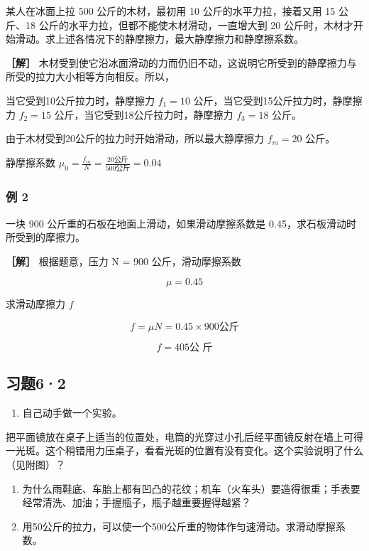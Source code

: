某人在冰面上拉 500 公斤的木材，最初用 10 公斤的水平力拉，接着又用 15
公斤、18 公斤的水平力拉，但都不能使木材滑动，一直增大到 20
公斤时，木材才开始滑动。求上述各情况下的静摩擦力，最大静摩擦力和静摩擦系数。

\textbf{［解］}
木材受到使它沿冰面滑动的力而仍旧不动，这说明它所受到的静摩擦力与所受的拉力大小相等方向相反。所以，

当它受到10公斤拉力时，静摩擦力 \(f_{1}=10\)
公斤，当它受到15公斤拉力时，静摩擦力 \(f_{2}=15\)
公斤，当它受到18公斤拉力时，静摩擦力 \(f_{3}=18\) 公斤。

由于木材受到20公斤的拉力时开始滑动，所以最大静摩擦力 \(f_{m}=20\) 公斤。

静摩擦系数
\(\mu_{0}=\frac{f_{m}}{N}=\frac{20\text{公斤}}{500\text{公斤}}=0.04\)

\subsubsection{例 2}\label{ux4f8b-2-6}

一块 900 公斤重的石板在地面上滑动，如果滑动摩擦系数是
0.45，求石板滑动时所受到的摩擦力。

\textbf{［解］} 根据题意，压力 N = 900 公斤，滑动摩擦系数

\[
\mu = 0.45
\]

求滑动摩擦力 \(f\)

\[
f = \mu N = 0.45 \times 900 \text{公斤}
\]

\[
f = 405 \text{公 斤}
\]

\subsection{习题6·2}\label{ux4e60ux989862}

\begin{enumerate}
\def\labelenumi{\arabic{enumi}.}
\tightlist
\item
  自己动手做一个实验。
\end{enumerate}

把平面镜放在桌子上适当的位置处，电筒的光穿过小孔后经平面镜反射在墙上可得一光斑。这个稍错用力压桌子，看看光斑的位置有没有变化。这个实验说明了什么（见附图）？

\begin{enumerate}
\def\labelenumi{\arabic{enumi}.}
\setcounter{enumi}{1}
\item
  为什么雨鞋底、车胎上都有凹凸的花纹；机车（火车头）要造得很重；手表要经常清洗、加油；手握瓶子，瓶子越重要握得越紧？
\item
  用50公斤的拉力，可以使一个500公斤重的物体作匀速滑动。求滑动摩擦系数。
\end{enumerate}

